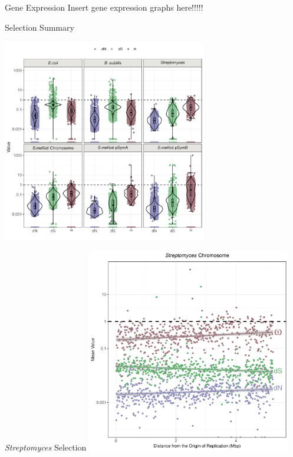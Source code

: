 \documentclass{beamer}
\newcommand{\strep}{\textit{Streptomyces}\xspace}
\begin{document}
\begin{frame}{Gene Expression}
	Insert gene expression graphs here!!!!!
\end{frame}
\begin{frame}{Selection Summary}
	
	\includegraphics[width=0.67\textwidth]{selection_vio_box.pdf}
\end{frame}
\begin{frame}{\strep Selection}
	\includegraphics[width=0.67\textwidth]{strep_selection.pdf}
\end{frame}
\end{document}
